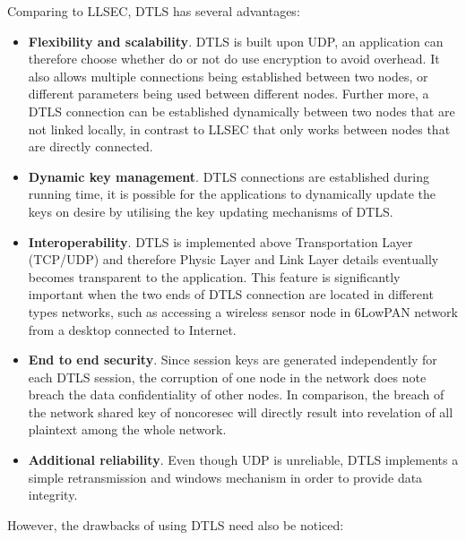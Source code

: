 Comparing to LLSEC, DTLS has several advantages:
\begin{itemize}
\item \textbf{Flexibility and scalability}. DTLS is built upon UDP, an application can therefore choose whether do or not do use encryption to avoid overhead. It also allows multiple connections being established between two nodes, or different parameters being used between different nodes. Further more, a DTLS connection can be established dynamically between two nodes that are not linked locally, in contrast to LLSEC that only works between nodes that are directly connected.
\item \textbf{Dynamic key management}. DTLS connections are established during running time, it is possible for the applications to dynamically update the keys on desire by utilising the key updating mechanisms of DTLS.
\item \textbf{Interoperability}. DTLS is implemented above Transportation Layer (TCP/UDP) and therefore Physic Layer and Link Layer details eventually becomes transparent to the application. This feature is significantly important when the two ends of DTLS connection are located in different types networks, such as accessing a wireless sensor node in 6LowPAN network from a desktop connected to Internet. 
\item \textbf{End to end security}. Since session keys are generated independently for each DTLS session, the corruption of one node in the network does note breach the data confidentiality of other nodes. In comparison, the breach of the network shared key of noncoresec will directly result into revelation of all plaintext among the whole network.
\item \textbf{Additional reliability}. Even though UDP is unreliable, DTLS implements a simple retransmission and windows mechanism in order to provide data integrity.
\end{itemize}

However, the drawbacks of using DTLS need also be noticed:

